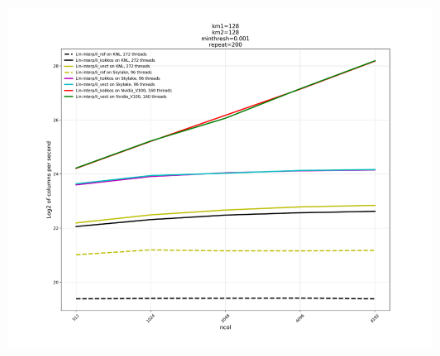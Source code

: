 \documentclass[10pt,twocolumn]{article}
\begin{document}
\begin{figure}[hbt]
  \centering
  \includegraphics{final-total.pdf}
\end{figure}
\end{document}
